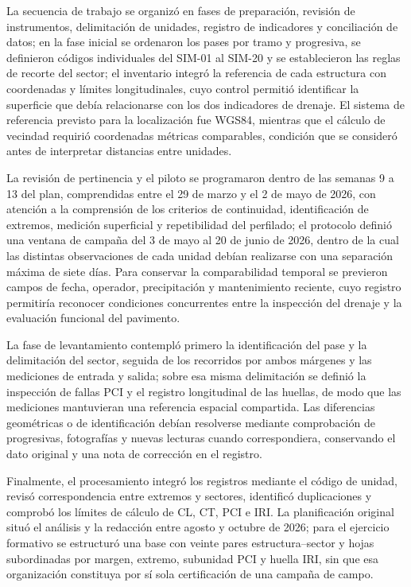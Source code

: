 
La secuencia de trabajo se organizó en fases de preparación, revisión de instrumentos, delimitación de unidades, registro de indicadores y conciliación de datos; en la fase inicial se ordenaron los pases por tramo y progresiva, se definieron códigos individuales del SIM-01 al SIM-20 y se establecieron las reglas de recorte del sector; el inventario integró la referencia de cada estructura con coordenadas y límites longitudinales, cuyo control permitió identificar la superficie que debía relacionarse con los dos indicadores de drenaje. El sistema de referencia previsto para la localización fue WGS84, mientras que el cálculo de vecindad requirió coordenadas métricas comparables, condición que se consideró antes de interpretar distancias entre unidades.

La revisión de pertinencia y el piloto se programaron dentro de las semanas 9 a 13 del plan, comprendidas entre el 29 de marzo y el 2 de mayo de 2026, con atención a la comprensión de los criterios de continuidad, identificación de extremos, medición superficial y repetibilidad del perfilado; el protocolo definió una ventana de campaña del 3 de mayo al 20 de junio de 2026, dentro de la cual las distintas observaciones de cada unidad debían realizarse con una separación máxima de siete días. Para conservar la comparabilidad temporal se previeron campos de fecha, operador, precipitación y mantenimiento reciente, cuyo registro permitiría reconocer condiciones concurrentes entre la inspección del drenaje y la evaluación funcional del pavimento.

La fase de levantamiento contempló primero la identificación del pase y la delimitación del sector, seguida de los recorridos por ambos márgenes y las mediciones de entrada y salida; sobre esa misma delimitación se definió la inspección de fallas PCI y el registro longitudinal de las huellas, de modo que las mediciones mantuvieran una referencia espacial compartida. Las diferencias geométricas o de identificación debían resolverse mediante comprobación de progresivas, fotografías y nuevas lecturas cuando correspondiera, conservando el dato original y una nota de corrección en el registro.

Finalmente, el procesamiento integró los registros mediante el código de unidad, revisó correspondencia entre extremos y sectores, identificó duplicaciones y comprobó los límites de cálculo de CL, CT, PCI e IRI. La planificación original situó el análisis y la redacción entre agosto y octubre de 2026; para el ejercicio formativo se estructuró una base con veinte pares estructura–sector y hojas subordinadas por margen, extremo, subunidad PCI y huella IRI, sin que esa organización constituya por sí sola certificación de una campaña de campo.

